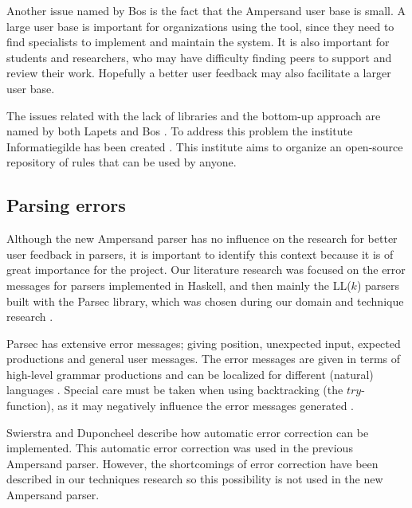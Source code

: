 Another issue named by Bos is the fact that the Ampersand user base is small.
A large user base is important for organizations using the tool, since they need to find specialists to implement and maintain the system.
It is also important for students and researchers, who may have difficulty finding peers to support and review their work.
Hopefully a better user feedback may also facilitate a larger user base.

The issues related with the lack of libraries and the bottom-up approach are named by both Lapets  and Bos .
To address this problem the institute Informatiegilde has been created .
This institute aims to organize an open-source repository of rules that can be used by anyone.

\subsection{Parsing errors}
Although the new Ampersand parser has no influence on the research for better user feedback in parsers, it is important to identify this context because it is of great importance for the project.
Our literature research was focused on the error messages for parsers implemented in Haskell, and then mainly the LL($k$) parsers built with the Parsec library, which was chosen during our domain and technique research .

Parsec has extensive error messages; giving position, unexpected input, expected productions and general user messages.
The error messages are given in terms of high-level grammar productions and can be localized for different (natural) languages .
Special care must be taken when using backtracking (the $try$-function), as it may negatively influence the error messages generated .

Swierstra and Duponcheel  describe how automatic error correction can be implemented.
This automatic error correction was used in the previous Ampersand parser.
However, the shortcomings of error correction have been described in our techniques research \cite{parsing} so this possibility is not used in the new Ampersand parser.











